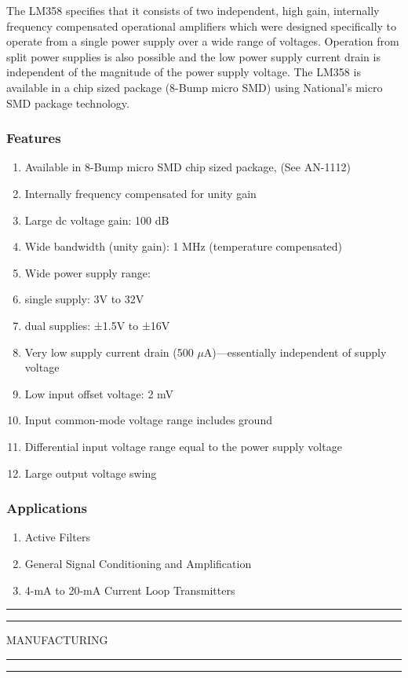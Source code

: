 \documentclass[12pt,a4paper,oneside,openright]{report}
\begin{document}
The LM358 specifies that it consists of two independent, high gain, internally frequency compensated operational amplifiers which were designed specifically to operate from a single power supply over a wide range of voltages. Operation from split power supplies is also possible and the low power supply current drain is independent of the magnitude of the power supply voltage. The LM358 is available in a chip sized package (8-Bump micro SMD) using National’s micro SMD package technology.
\subsubsection{Features}
\begin{enumerate}
 \item Available in 8-Bump micro SMD chip sized package, (See AN-1112)
\item Internally frequency compensated for unity gain
\item Large dc voltage gain: 100 dB
\item Wide bandwidth (unity gain): 1 MHz (temperature compensated)
\item Wide power supply range:
\item single supply: 3V to 32V
\item dual supplies: ±1.5V to ±16V
\item Very low supply current drain (500 $\mu$A)—essentially independent of supply voltage
\item Low input offset voltage: 2 mV
\item Input common-mode voltage range includes ground
\item Differential input voltage range equal to the power supply voltage
\item Large output voltage swing
\end{enumerate}

\subsubsection{Applications} 
\begin{enumerate}
 \item Active Filters 
 \item General Signal Conditioning and Amplification
 \item 4-mA to 20-mA Current Loop Transmitters
\end{enumerate}


\newpage
\vspace*{\fill}
 \begin{center}
\hrule%
\vspace{1pt}%
\hrule
\vspace{1pc}%
\LARGE\MakeUppercase{MANUFACTURING} 
\vspace{1pc}%
\hrule%
\vspace{1pt}%
\hrule
 \end{center}
 \vspace*{\fill}
\end{document}

